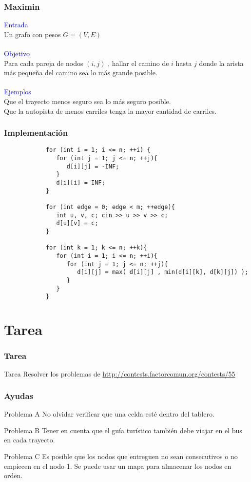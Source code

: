 \documentclass{beamer}
\begin{document}
	\begin{frame}
		\frametitle{Maximin}
		\textcolor{blue}{\large Entrada}\\
		Un grafo con pesos $G = (V, E)$ \\ \quad \\
		\textcolor{blue}{\large Objetivo}\\
		Para cada pareja de nodos $(i, j)$ , hallar el camino de $i$ hasta $j$ donde la arista más pequeña del camino sea lo más grande posible.\\ \quad \\
		\textcolor{blue}{\large Ejemplos}\\
		Que el trayecto menos seguro sea lo más seguro posible.\\
		Que la autopista de menos carriles tenga la mayor cantidad de carriles.
	\end{frame}
	
	
	\begin{frame}[fragile]
		\frametitle{Implementación}
		\begin{lstlisting}
			for (int i = 1; i <= n; ++i) {
			   for (int j = 1; j <= n; ++j){
			      d[i][j] = -INF;
			   }
			   d[i][i] = INF;
			}

			for (int edge = 0; edge < m; ++edge){
			   int u, v, c; cin >> u >> v >> c;
			   d[u][v] = c;
			}
			
			for (int k = 1; k <= n; ++k){
			   for (int i = 1; i <= n; ++i){
			      for (int j = 1; j <= n; ++j){
			         d[i][j] = max( d[i][j] , min(d[i][k], d[k][j]) );
			      }
			   }
			}
		\end{lstlisting}
	\end{frame}
	
	\section{Tarea}
		\begin{frame}[fragile]
			\frametitle{Tarea}
			\begin{alertblock}{Tarea}
				Resolver los problemas de \url{http://contests.factorcomun.org/contests/55}
			\end{alertblock}
		\end{frame}

		\begin{frame}[fragile]
			\frametitle{Ayudas}
			\begin{block}{Problema A}
				No olvidar verificar que una celda esté dentro del tablero.
			\end{block}
			\begin{block}{Problema B}
				Tener en cuenta que el guía turístico también debe viajar en el bus en cada trayecto.
			\end{block}
			\begin{block}{Problema C}
				Es posible que los nodos que entreguen no sean consecutivos o no empiecen en el nodo 1. Se puede usar un mapa para almacenar los nodos en orden.
			\end{block}
		\end{frame}
\end{document}

